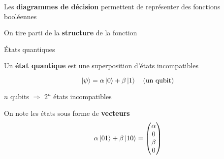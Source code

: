 \begin{frame}
    Les \textbf{diagrammes de décision} permettent de représenter des fonctions booléennes

    \vspace{1em}
    \begin{center}

    \vspace{1em}

    On tire parti de la \textbf{structure} de la fonction
    \end{center}
\end{frame}

\begin{frame}{États quantiques}

    Un \textbf{état quantique} est une superposition d'états incompatibles

    $$\ket{\psi} = \alpha \ket{0} + \beta \ket{1} \quad \text{(un qubit)}$$

    \pause
    \begin{center}
        $n$ qubits $\Rightarrow$ $2^n$ états incompatibles
    \end{center}
On note les états sous forme de \textbf{vecteurs}
$$\alpha \ket {01} + \beta \ket {10} = \begin{pmatrix}
    \alpha \\ 0 \\ \beta \\ 0
\end{pmatrix}$$
\end{frame}

